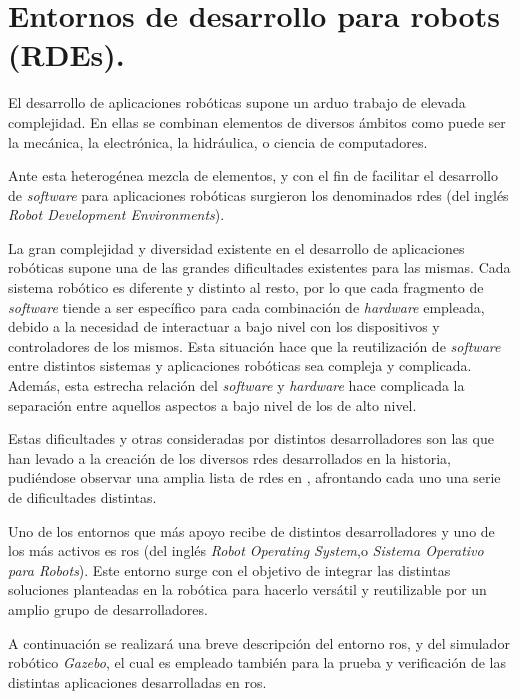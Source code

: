 \section{Entornos de desarrollo para robots (RDEs).}

El desarrollo de aplicaciones robóticas supone un arduo trabajo de elevada complejidad. En ellas se combinan elementos de diversos ámbitos como puede ser la mecánica, la electrónica, la hidráulica, o ciencia de computadores. \par 

Ante esta heterogénea mezcla de elementos, y con el fin de facilitar el desarrollo de \emph{software} para aplicaciones robóticas surgieron los denominados \acrshort{rde}s (del inglés \emph{Robot Development Environments}). \par 

La gran complejidad y diversidad existente en el desarrollo de aplicaciones robóticas supone una de las grandes dificultades existentes para las mismas. Cada sistema robótico es diferente y distinto al resto, por lo que cada fragmento de \emph{software} tiende a ser específico para cada combinación de \emph{hardware} empleada, debido a la necesidad de interactuar a bajo nivel con los dispositivos y controladores de los mismos. Esta situación hace que la reutilización de \emph{software} entre distintos sistemas y aplicaciones robóticas sea compleja y complicada. Además, esta estrecha relación del \emph{software} y \emph{hardware} hace complicada la separación entre aquellos aspectos a bajo nivel de los de alto nivel. \par 

Estas dificultades y otras consideradas por distintos desarrolladores son las que han levado a la creación de los diversos \acrshort{rde}s desarrollados en la historia, pudiéndose observar una amplia lista de \acrshort{rde}s en \cite{kramer2007development}, afrontando cada uno una serie de dificultades distintas. \par 

Uno de los entornos que más apoyo recibe de distintos desarrolladores y uno de los más activos es \acrshort{ros} (del inglés \emph{Robot Operating System},o \emph{Sistema Operativo para Robots}). Este entorno surge con el objetivo de integrar las distintas soluciones planteadas en la robótica para hacerlo versátil y reutilizable por un amplio grupo de desarrolladores. \par 

A continuación se realizará una breve descripción del entorno \acrshort{ros}, y del simulador robótico \emph{Gazebo}, el cual es empleado también para la prueba y verificación de las distintas aplicaciones desarrolladas en \acrshort{ros}. \par 

